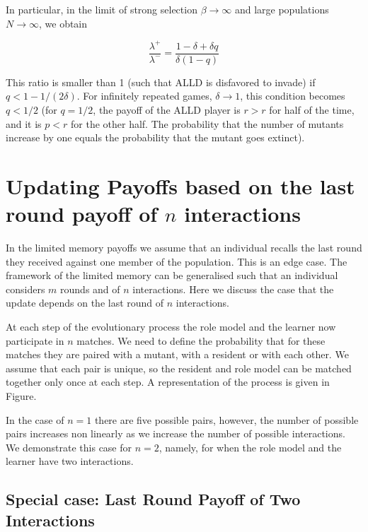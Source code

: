 \documentclass[11pt]{article}
\theoremstyle{plainCl1}
\theoremstyle{plainCl2}
\begin{document}
In particular, in the limit of strong selection \(\beta \rightarrow \infty\) and
large populations \(N \rightarrow \infty \), we obtain

\begin{equation*}
    \frac{\lambda^{+}}{\lambda^{-}} = \frac{1 - \delta + \delta q}{\delta(1 - q)}
\end{equation*}

This ratio is smaller than 1 (such that ALLD is disfavored to invade) if \(q <
1- 1/(2 \delta)\). For infinitely repeated games, \(\delta \rightarrow 1\), this
condition becomes \(q < 1/2\) (for \(q = 1/2\), the payoff of the ALLD player is
\(r > r\) for half of the time, and it is \(p < r\) for the other half. The
probability that the number of mutants increase by one equals the probability
that the mutant goes extinct).

\section{Updating Payoffs based on the last round payoff of $n$ interactions}\label{section:m_one_n_two}

In the limited memory payoffs we assume that an individual recalls the last
round they received against one member of the population. This is an edge case.
The framework of the limited memory can be generalised such that an individual
considers \(m\) rounds and of \(n\) interactions. Here we discuss the case that
the update depends on the last round of \(n\) interactions.

At each step of the evolutionary process the role model and the learner now
participate in \(n\) matches. We need to define the probability that for these
matches they are paired with a mutant, with a resident or with each other. We
assume that each pair is unique, so the resident and role model can be matched
together only once at each step. A representation of the process is given in
Figure.

In the case of \(n=1\) there are five possible pairs, however, the number of
possible pairs increases non linearly as we increase the number of possible
interactions. We demonstrate this case for \(n=2\), namely, for when the role
model and the learner have two interactions.


\subsection*{Special case: Last Round Payoff of Two Interactions}
\end{document}
